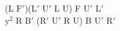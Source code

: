 (L $\text{F}'$)($\text{L}'$ $\text{U}'$ L U) F $\text{U}'$ $\text{L}'$\\
$\text{y}^2$ R $\text{B}'$ ($\text{R}'$ $\text{U}'$ R U) B $\text{U}'$ $\text{R}'$\\
